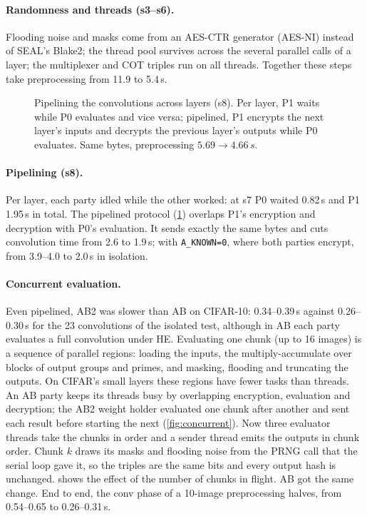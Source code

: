 \documentclass[10pt,a4paper]{article}
\newcommand{\flag}[1]{\nolinkurl{#1}}
\newcommand{\s}{\,s\xspace}
\begin{document}
\paragraph{Randomness and threads (s3--s6).} Flooding noise and masks come from an AES-CTR generator
(AES-NI) instead of SEAL's Blake2; the thread pool survives across the several parallel calls of a layer;
the multiplexer and COT triples run on all threads. Together these steps take preprocessing from 11.9 to 5.4\s.

\begin{figure}[t]
  \centering
  \caption{Pipelining the convolutions across layers (s8). Per layer, P1 waits while P0 evaluates and
  vice versa; pipelined, P1 encrypts the next layer's inputs and decrypts the previous layer's outputs
  while P0 evaluates. Same bytes, preprocessing $5.69\to4.66\s$.}
  \label{fig:pipeline}
\end{figure}

\paragraph{Pipelining (s8).} Per layer, each party idled while the other worked: at s7 P0 waited
0.82\s and P1 1.95\s in total. The pipelined protocol (\cref{fig:pipeline}) overlaps P1's
encryption and decryption with P0's evaluation. It sends exactly the same bytes and cuts convolution
time from 2.6 to 1.9\s; with \flag{A_KNOWN=0}, where both parties encrypt, from 3.9--4.0 to 2.0\s in
isolation.

\paragraph{Concurrent evaluation.} Even pipelined, AB2 was slower than AB on CIFAR-10: 0.34--0.39\s against
0.26--0.30\s for the 23 convolutions of the isolated test, although in AB each party evaluates a full convolution under HE.
Evaluating one chunk (up to 16 images) is a sequence of parallel regions: loading the inputs, the multiply-accumulate over
blocks of output groups and primes, and masking, flooding and truncating the outputs. On CIFAR's small layers these regions
have fewer tasks than threads. An AB party keeps its threads busy by overlapping encryption, evaluation and decryption;
the AB2 weight holder evaluated one chunk after another and sent each result before starting the next (\cref{fig:concurrent}).
Now three evaluator threads take the chunks in order and a sender thread emits the outputs in chunk order. Chunk $k$
draws its masks and flooding noise from the PRNG call that the serial loop gave it, so the triples are the same bits
and every output hash is unchanged.  shows the effect of the number of chunks in flight. AB got the same change.
End to end, the conv phase of a 10-image preprocessing halves, from 0.54--0.65 to 0.26--0.31\s.
\end{document}
